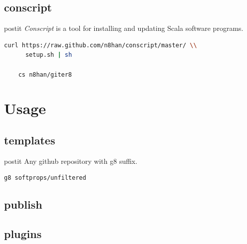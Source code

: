 \documentclass[utf8,utf8x]{beamer}
\begin{document}
\subsection{conscript}
\begin{frame}[fragile]
  \begin{beamercolorbox}[shadow=true, rounded=true]{postit}
    \textit{Conscript} is a tool for installing and updating Scala software programs. \cite{cs}
  \end{beamercolorbox}

  \begin{lstlisting}[language=bash]
    curl https://raw.github.com/n8han/conscript/master/ \\
      setup.sh | sh
  
    cs n8han/giter8  
  \end{lstlisting}
\end{frame}

\section{Usage}
\frame{\tableofcontents[currentsection]}

\subsection{templates}
\begin{frame}[fragile]
  \begin{beamercolorbox}[shadow=true, rounded=true]{postit}
  Any github repository with g8 suffix.
  \end{beamercolorbox}

  \begin{lstlisting}[language=bash]
    g8 softprops/unfiltered
  \end{lstlisting}
\end{frame}

\subsection{publish}

\subsection{plugins}
\end{document}
